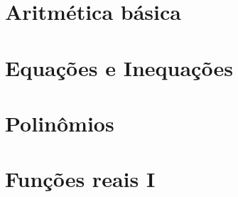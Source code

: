 \documentclass[
	12pt, %
	a4paper, %
	oneside, %
]{LegrandOrangeBook}
\let\cleardoublepage\clearpage
\begin{document}


\pagestyle{fancy} %




\chapterspaceabove{6.75cm} %
\chapterspacebelow{7.25cm} %


\part{Aritmética básica}


%
%

\part{Equações e Inequações}



%

\part{Polinômios}



%

\part{Funções reais I}



%


% 
\end{document}
